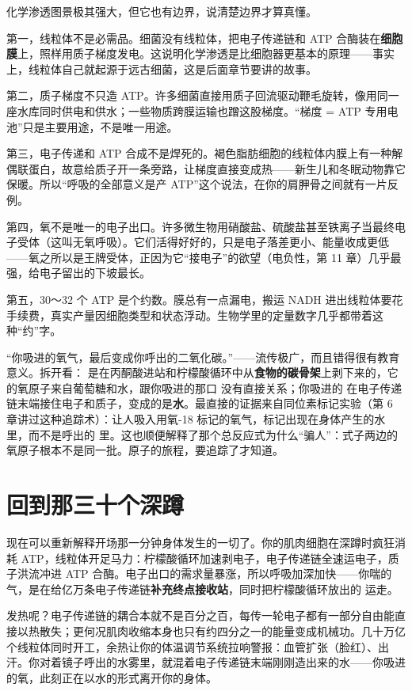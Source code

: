 化学渗透图景极其强大，但它也有边界，说清楚边界才算真懂。

第一，线粒体不是必需品。细菌没有线粒体，把电子传递链和 ATP 合酶装在\textbf{细胞膜}上，照样用质子梯度发电。这说明化学渗透是比细胞器更基本的原理——事实上，线粒体自己就起源于远古细菌，这是后面章节要讲的故事。

第二，质子梯度不只造 ATP。许多细菌直接用质子回流驱动鞭毛旋转，像用同一座水库同时供电和供水；一些物质跨膜运输也蹭这股梯度。“梯度 = ATP 专用电池”只是主要用途，不是唯一用途。

第三，电子传递和 ATP 合成不是焊死的。褐色脂肪细胞的线粒体内膜上有一种解偶联蛋白，故意给质子开一条旁路，让梯度直接变成热——新生儿和冬眠动物靠它保暖。所以“呼吸的全部意义是产 ATP”这个说法，在你的肩胛骨之间就有一片反例。

第四，氧不是唯一的电子出口。许多微生物用硝酸盐、硫酸盐甚至铁离子当最终电子受体（这叫无氧呼吸）。它们活得好好的，只是电子落差更小、能量收成更低——氧之所以是王牌受体，正因为它“接电子”的欲望（电负性，第 11 章）几乎最强，给电子留出的下坡最长。

第五，30～32 个 ATP 是个约数。膜总有一点漏电，搬运 NADH 进出线粒体要花手续费，真实产量因细胞类型和状态浮动。生物学里的定量数字几乎都带着这种“约”字。

\begin{wuqu}
“你吸进的氧气，最后变成你呼出的二氧化碳。”——流传极广，而且错得很有教育意义。拆开看： 是在丙酮酸进站和柠檬酸循环中从\textbf{食物的碳骨架}上剥下来的，它的氧原子来自葡萄糖和水，跟你吸进的那口  没有直接关系；你吸进的  在电子传递链末端接住电子和质子，变成的是\textbf{水}。最直接的证据来自同位素标记实验（第 6 章讲过这种追踪术）：让人吸入用氧-18 标记的氧气，标记出现在身体产生的水里，而不是呼出的  里。这也顺便解释了那个总反应式为什么“骗人”：式子两边的氧原子根本不是同一批。原子的旅程，要追踪了才知道。
\end{wuqu}

\section{回到那三十个深蹲}

现在可以重新解释开场那一分钟身体发生的一切了。你的肌肉细胞在深蹲时疯狂消耗 ATP，线粒体开足马力：柠檬酸循环加速剥电子，电子传递链全速运电子，质子洪流冲进 ATP 合酶。电子出口的需求量暴涨，所以呼吸加深加快——你喘的气，是在给亿万条电子传递链\textbf{补充终点接收站}，同时把柠檬酸循环放出的  运走。

发热呢？电子传递链的耦合本就不是百分之百，每传一轮电子都有一部分自由能直接以热散失；更何况肌肉收缩本身也只有约四分之一的能量变成机械功。几十万亿个线粒体同时开工，余热让你的体温调节系统拉响警报：血管扩张（脸红）、出汗。你对着镜子呼出的水雾里，就混着电子传递链末端刚刚造出来的水——你吸进的氧，此刻正在以水的形式离开你的身体。

